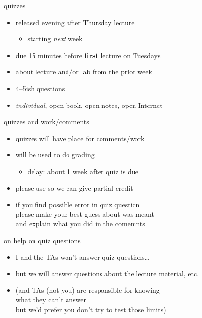\begin{frame}{quizzes}
    \begin{itemize}
    \item released evening after Thursday lecture
        \begin{itemize}
        \item starting \textit{next} week
        \end{itemize}
    \item due 15 minutes before \textbf{first} lecture on Tuesdays
    \vspace{.5cm}
    \item about lecture and/or lab from the prior week
    \item 4--5ish questions
    \item \textit{individual}, open book, open notes, open Internet
    \end{itemize}
\end{frame}

\begin{frame}{quizzes and work/comments}
    \begin{itemize}
    \item quizzes will have place for comments/work
    \vspace{.5cm}
    \item will be used to do grading
        \begin{itemize}
        \item delay: about 1 week after quiz is due
        \end{itemize}
    \item please use so we can give partial credit
    \item if you find possible error in quiz question \\
        please make your best guess about was meant \\
        and explain what you did in the comemnts
    \end{itemize}
\end{frame}

\begin{frame}{on help on quiz questions}
    \begin{itemize}
    \item I and the TAs won't answer quiz questions\ldots
    \item but we will answer questions about the lecture material, etc.
    \vspace{.5cm}
    \item (and TAs (not you) are responsible for knowing \\
        what they can't answer \\
        but we'd prefer you don't try to test those limits)
    \end{itemize}
\end{frame}

